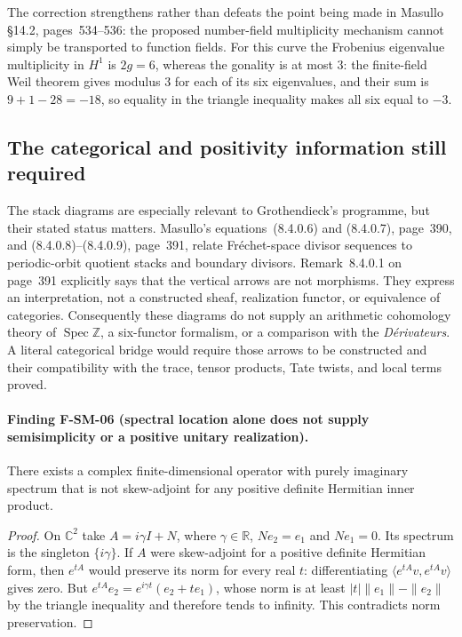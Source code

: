 \documentclass[11pt,a4paper]{article}
\theoremstyle{definition}\newtheorem{definition}[theorem]{Definition}
\theoremstyle{remark}\newtheorem{remark}[theorem]{Remark}
\begin{document}
The correction strengthens rather than defeats the point being made in
Masullo \S14.2, pages~534--536: the proposed number-field multiplicity
mechanism cannot simply be transported to function fields.  For this
curve the Frobenius eigenvalue multiplicity in $H^1$ is $2g=6$, whereas
the gonality is at most $3$: the finite-field Weil theorem gives modulus
$3$ for each of its six eigenvalues, and their sum is
$9+1-28=-18$, so equality in the triangle inequality makes all six
equal to $-3$.

\subsection{The categorical and positivity information still required}

The stack diagrams are especially relevant to Grothendieck's programme,
but their stated status matters.  Masullo's equations~(8.4.0.6) and
(8.4.0.7), page~390, and (8.4.0.8)--(8.4.0.9), page~391, relate
Fr\'echet-space divisor sequences to periodic-orbit quotient stacks and
boundary divisors.  Remark~8.4.0.1 on page~391 explicitly says that the
vertical arrows are not morphisms.  They express an interpretation, not
a constructed sheaf, realization functor, or equivalence of categories.
Consequently these diagrams do not supply an arithmetic cohomology theory
of $\operatorname{Spec}\mathbb Z$, a six-functor formalism, or a comparison
with the \emph{D\'erivateurs}.  A literal categorical bridge would require
those arrows to be constructed and their compatibility with the trace,
tensor products, Tate twists, and local terms proved.

\paragraph{Finding F-SM-06 (spectral location alone does not supply
semisimplicity or a positive unitary realization).}
There exists a complex finite-dimensional operator with purely imaginary
spectrum that is not skew-adjoint for any positive definite Hermitian
inner product.

\begin{proof}
On $\mathbb C^2$ take $A=i\gamma I+N$, where $\gamma\in\mathbb R$,
$Ne_2=e_1$ and $Ne_1=0$.  Its spectrum is the singleton $\{i\gamma\}$.
If $A$ were skew-adjoint for a positive definite Hermitian form, then
$e^{tA}$ would preserve its norm for every real $t$: differentiating
$\langle e^{tA}v,e^{tA}v\rangle$ gives zero.  But
$e^{tA}e_2=e^{i\gamma t}(e_2+te_1)$, whose norm is at least
$|t|\|e_1\|-\|e_2\|$ by the triangle inequality and therefore tends
to infinity.  This contradicts norm preservation.
\end{proof}
\end{document}
